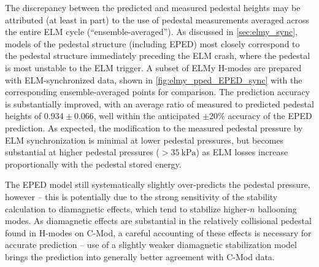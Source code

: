 The discrepancy between the predicted and measured pedestal heights may be attributed (at least in part) to the use of pedestal measurements averaged across the entire ELM cycle (``ensemble-averaged'').  As discussed in \cref{sec:elmy_sync}, models of the pedestal structure (including EPED) most closely correspond to the pedestal structure immediately preceding the ELM crash, where the pedestal is most unstable to the ELM trigger.  A subset of ELMy H-modes are prepared with ELM-synchronized data, shown in \cref{fig:elmy_pped_EPED_sync} with the corresponding ensemble-averaged points for comparison.  The prediction accuracy is substantially improved, with an average ratio of measured to predicted pedestal heights of $0.934 \pm 0.066$, well within the anticipated $\pm 20\%$ accuracy of the EPED prediction.  As expected, the modification to the measured pedestal pressure by ELM synchronization is minimal at lower pedestal pressures, but becomes substantial at higher pedestal pressures ($> \SI{35}{\kilo\pascal}$)
 as ELM losses increase proportionally with the pedestal stored energy.

The EPED model still systematically slightly over-predicts the pedestal pressure, however -- this is potentially due to the strong sensitivity of the stability calculation to diamagnetic effects, which tend to stabilize higher-$n$ ballooning modes.  As diamagnetic effects are substantial in the relatively collisional pedestal found in H-modes on C-Mod, a careful accounting of these effects is necessary for accurate prediction -- use of a slightly weaker diamagnetic stabilization model brings the prediction into generally better agreement with C-Mod data.

\begin{figure}[t]
 \pushtooutside
\end{figure}

